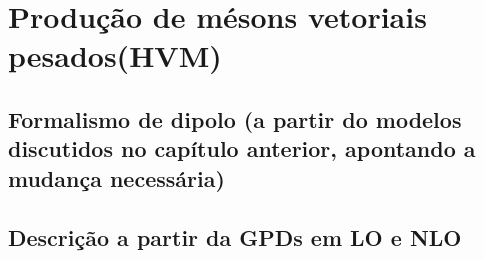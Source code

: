 \chapter{Produção de mésons vetoriais pesados(HVM)}
\label{cap2}
\section{Formalismo de dipolo (a partir do modelos discutidos no capítulo anterior, apontando a mudança necessária)}
\section{Descrição a partir da GPDs em LO e NLO}

